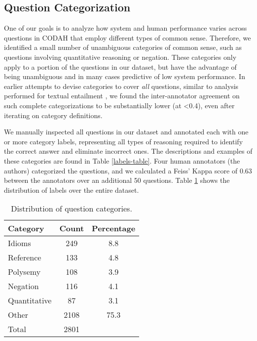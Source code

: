 \documentclass[11pt,a4paper]{article}
\begin{document}
    \subsection{Question Categorization}
    One of our goals is to analyze how system and human performance varies across questions in CODAH that employ different types of common sense. Therefore, we identified a small number of unambiguous categories of common sense, such as questions involving quantitative reasoning or negation. These categories only apply to a portion of the questions in our dataset, but have the advantage of being unambiguous and in many cases predictive of low system performance. In earlier attempts to devise categories to cover {\em all} questions, similar to analysis performed for textual entailment \cite{lobue2011types},  we found the inter-annotator agreement on such complete categorizations to be substantially lower (at \textless 0.4), even after iterating on category definitions. 
    
    We manually inspected all questions in our dataset and annotated each with one or more category labels, representing all types of reasoning required to identify the correct answer and eliminate incorrect ones. The descriptions and examples of these categories are found in Table \ref{labels-table}. Four human annotators (the authors) categorized the questions, and we calculated a Feiss' Kappa score of 0.63 between the annotators over an additional 50 questions. Table \ref{class-table} shows the distribution of labels over the entire dataset.
    
    \begin{table}[ht]
        \begin{center}
        \small
            \begin{tabular}{|l|c|c|}
            \hline \bf Category & \bf Count & \bf Percentage \\ \hline\hline
            Idioms & 249 &  8.8 \\ \hline
            Reference & 133 & 4.8 \\ \hline
            Polysemy & 108 & 3.9 \\ \hline
            Negation & 116 &  4.1 \\ \hline
            Quantitative & 87 & 3.1 \\ \hline
            Other & 2108 & 75.3  \\ \hline\hline
            Total & 2801  & \\ \hline
            \end{tabular}
        \end{center}
        \caption{\label{class-table} Distribution of question categories.}
    \end{table}
    
\end{document}
